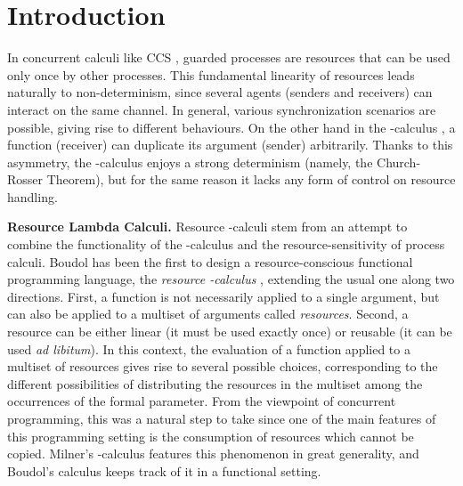 \documentclass{LMCS}
\begin{document}
\maketitle


\section{Introduction}


In concurrent calculi like CCS \cite{Milner80}, guarded processes are resources
that can be used only once by other processes. This fundamental 
linearity of resources leads naturally to non-determinism,
since several agents  (senders and receivers) 
can interact on the same channel. In general, 
various synchronization scenarios are possible, giving  rise to 
different behaviours. On the other hand in the -calculus \cite{Bare}, a
function (receiver) can duplicate its argument (sender) arbitrarily. 
Thanks to this asymmetry, the -calculus enjoys a
strong determinism (namely, the Church-Rosser Theorem), but for the same reason it 
lacks any form of control on resource handling. 
\medskip

{\bf Resource Lambda Calculi.} Resource -calculi stem from an attempt to combine 
the functionality of the -calculus and 
the resource-sensitivity of process calculi.
Boudol has been the first to design a resource-conscious functional programming language, 
the \emph{resource -calculus}  \cite{Boudol93}, extending the usual one 
along two directions. 
First, a function is not necessarily applied to a single argument, but can also be
applied to a multiset of arguments called \emph{resources}.
Second, a resource can be either linear (it must be used exactly once) or reusable (it can be used \emph{ad libitum}). 
In this context, the evaluation of a function applied to a multiset of resources gives rise to several possible choices, 
corresponding to the different possibilities of distributing the resources in the multiset among the occurrences of the formal parameter.
From the viewpoint of concurrent programming, this  was a natural step to take since one
of the main features of this programming setting is the consumption of
resources which cannot be copied. Milner's
-calculus \cite{Milner93} features this phenomenon in great generality, and Boudol's
calculus keeps track of it in a functional setting.
\end{document}
